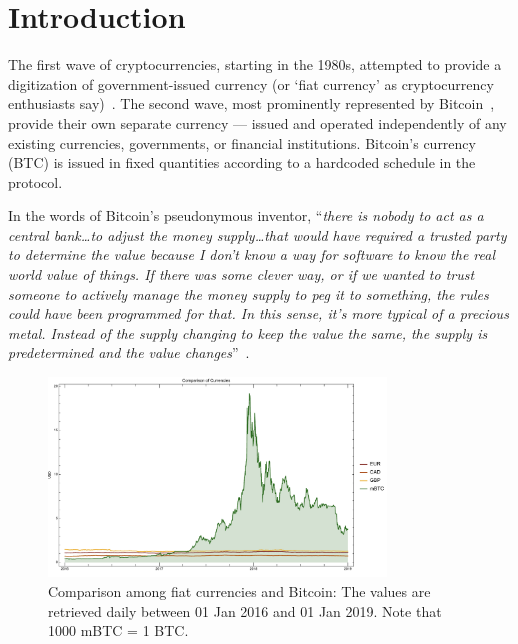 
\section{Introduction}\label{sec:Intro}

The first wave of cryptocurrencies, starting in the 1980s, attempted to provide a digitization of government-issued currency (or `fiat currency' as cryptocurrency enthusiasts say)~\cite{NBFMG16}. The second wave, most prominently represented by Bitcoin~\cite{nakamoto2008bitcoin}, provide their own separate currency --- issued and operated independently of any existing currencies, governments, or financial institutions. Bitcoin's currency (BTC) is issued in fixed quantities according to a hardcoded schedule in the protocol. 

In the words of Bitcoin's pseudonymous inventor, ``\textit{there is nobody to act as a central bank\ldots to adjust the money supply\ldots that would have required a trusted party to determine the value because I don’t know a way for software to know the real world value of things. If there was some clever way, or if we wanted to trust someone to actively manage the money supply to peg it to something, the rules could have been programmed for that. In this sense, it’s more typical of a precious metal. Instead of the supply changing to keep the value the same, the supply is predetermined and the value changes}''~\cite{Cha14}.

\begin{figure}[t]
	\centering
	\includegraphics[width=0.8\textwidth]{figures/allCurrencies.pdf}
	\caption{\label{fig:btcandfiat}Comparison among fiat currencies and Bitcoin: The values are retrieved daily between  01 Jan 2016 and 01 Jan 2019. Note that 1000 mBTC = 1 BTC.}
\end{figure}

